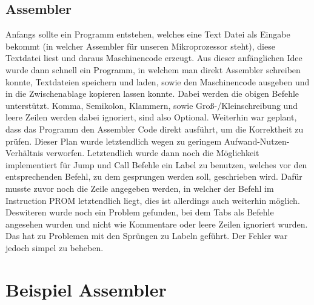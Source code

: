\documentclass{scrartcl}
\begin{document}
\subsection{Assembler}
Anfangs sollte ein Programm entstehen, welches eine Text Datei als Eingabe bekommt (in welcher Assembler
für unseren Mikroprozessor steht), diese Textdatei liest und daraus Maschinencode erzeugt.
Aus dieser anfänglichen Idee wurde dann schnell ein Programm, in welchem man direkt Assembler schreiben
konnte, Textdateien speichern und laden, sowie den Maschinencode ausgeben und in die Zwischenablage 
kopieren lassen konnte. Dabei werden die obigen Befehle unterstützt.
Komma, Semikolon, Klammern, sowie Groß-/Kleinschreibung und leere Zeilen werden dabei ignoriert, sind also Optional. Weiterhin war geplant, dass das Programm den Assembler Code direkt ausführt, um die Korrektheit zu prüfen. Dieser Plan wurde letztendlich wegen zu geringem Aufwand-Nutzen-Verhältnis verworfen.
Letztendlich wurde dann noch die Möglichkeit implementiert für Jump und Call Befehle ein Label zu
benutzen, welches vor den entsprechenden Befehl, zu dem gesprungen werden soll, geschrieben wird.
Dafür musste zuvor noch die Zeile angegeben werden, in welcher der Befehl im Instruction PROM
letztendlich liegt, dies ist allerdings auch weiterhin möglich. Deswiteren wurde noch ein Problem gefunden,
bei dem Tabs als Befehle angesehen wurden und nicht wie Kommentare oder leere Zeilen ignoriert wurden.
Das hat zu Problemen mit den Sprüngen zu Labeln geführt. Der Fehler war jedoch simpel zu beheben.


\newpage
\section{Beispiel Assembler}\label{sec:BeispielAssembler}
\end{document}
